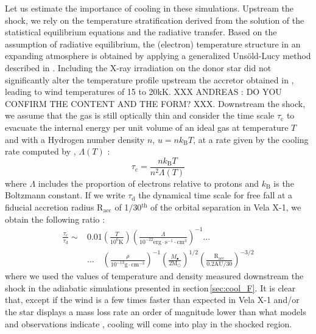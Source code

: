 \documentclass{aa}
\begin{document}
Let us estimate the importance of cooling in these simulations. Upstream the shock, we rely on the temperature stratification derived from the solution of the statistical equilibrium equations and the radiative transfer. Based on the assumption of radiative equilibrium, the (electron) temperature structure in an expanding atmosphere is obtained by applying a generalized Uns{\"o}ld-Lucy method described in \citet{Hamann1998}. Including the X-ray irradiation on the donor star did not significantly alter the temperature profile upstream the accretor obtained in \cite{Sander2017}, leading to wind temperatures of 15 to 20kK. XXX ANDREAS : DO YOU CONFIRM THE CONTENT AND THE FORM? XXX. Downstream the shock, we assume that the gas is still optically thin and consider the time scale $\tau_{\text{c}}$ to evacuate the internal energy per unit volume of an ideal gas at temperature $T$ and with a Hydrogen number density $n$, $u=nk_{\text{B}}T$, at a rate given by the cooling rate computed by \cite{Schure2009}, $\Lambda\left(T\right)$ :
\begin{equation}
\tau_{\text{c}}=\frac{nk_{\text{B}}T}{n^2\Lambda\left(T\right)}
\end{equation}
where $\Lambda$ includes the proportion of electrons relative to protons and $k_{\text{B}}$ is the Boltzmann constant. If we write $\tau_{\text{d}}$ the dynamical time scale for free fall at a fiducial accretion radius R$_{\text{acc}}$ of 1$/$30$^{\text{th}}$ of the orbital separation in Vela X-1, we obtain the following ratio :
\begin{align}
\frac{\tau_{\text{c}}}{\tau_{\text{d}}}\sim & 0.01\left(\frac{T}{10^6\text{K}}\right)\left(\frac{\Lambda}{10^{-22}\text{erg}\cdot\text{s}^{-1}\cdot\text{cm}^{3}}\right)^{-1} \text{...}\\
&  \text{...} \quad \left(\frac{\rho}{10^{-13}\text{g}\cdot\text{cm}^{-3}}\right)^{-1}\left(\frac{M_{\bullet}}{2\text{M}_{\odot}}\right)^{1/2}\left(\frac{\text{R}_{\text{acc}}}{0.2\text{AU}/30}\right)^{-3/2}
\end{align}
where we used the values of temperature and density measured downstream the shock in the adiabatic simulations presented in section\,\ref{sec:cool_F}. It is clear that, except if the wind is a few times faster than expected in Vela X-1 and/or the star displays a mass loss rate an order of magnitude lower than what models and observations indicate \cite[$\sim$1.3$\cdot 10^{-6}$M$_{\odot}\cdot$yr$^{-1}$,][]{Gimenez-Garcia2016}, cooling will come into play in the shocked region. 
\end{document}
